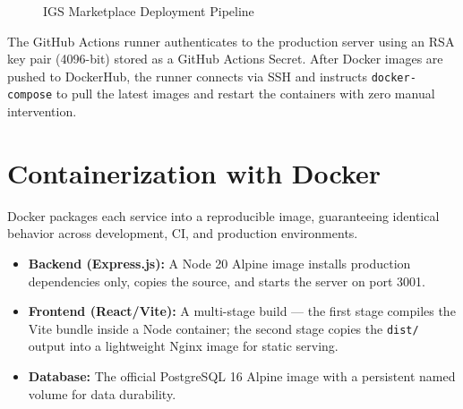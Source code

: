 \begin{figure}[H]
\centering
{}
\caption{IGS Marketplace Deployment Pipeline}
\label{fig:deploy_diagram}
\end{figure}

The GitHub Actions runner authenticates to the production server using an RSA key pair (4096-bit) stored as a GitHub Actions Secret. After Docker images are pushed to DockerHub, the runner connects via SSH and instructs \texttt{docker-compose} to pull the latest images and restart the containers with zero manual intervention.

\section{Containerization with Docker}

Docker packages each service into a reproducible image, guaranteeing identical behavior across development, CI, and production environments.

\begin{itemize}
  \item \textbf{Backend (Express.js):} A Node 20 Alpine image installs production dependencies only, copies the source, and starts the server on port 3001.
  \item \textbf{Frontend (React/Vite):} A multi-stage build — the first stage compiles the Vite bundle inside a Node container; the second stage copies the \texttt{dist/} output into a lightweight Nginx image for static serving.
  \item \textbf{Database:} The official PostgreSQL 16 Alpine image with a persistent named volume for data durability.
\end{itemize}

